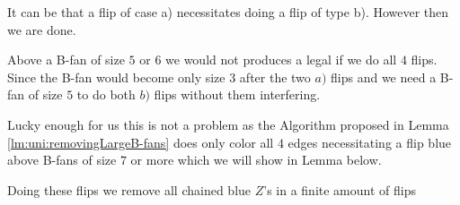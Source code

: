 It can be that a flip of case a) necessitates doing a flip of type b). However then we are done.

Above a B-fan of size $5$ or $6$ we would not produces a legal \rel if we do all $4$ flips. Since the B-fan would become only size $3$ after the two $a)$ flips and we need a B-fan of size $5$ to do both $b)$ flips without them interfering.

Lucky enough for us this is not a problem as the Algorithm proposed in Lemma \ref{lm:uni:removingLargeB-fans} does only color all $4$ edges necessitating a flip blue above B-fans of size $7$ or more which we will show in Lemma below.



\begin{lemma}
  \label{lm:uni:flips}
  Doing these flips we remove all chained blue $Z$'s in a finite amount of flips
\end{lemma}

